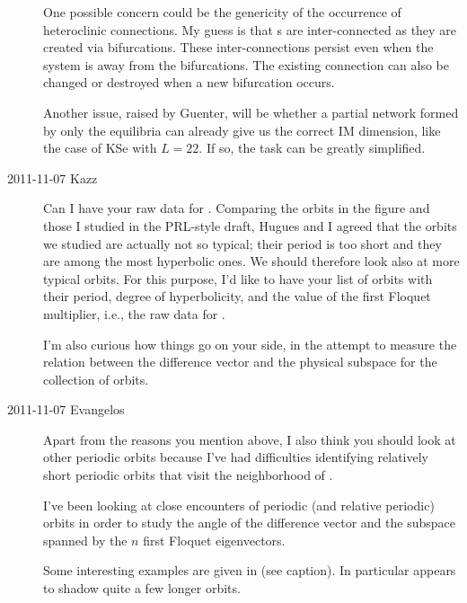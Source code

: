 \begin{description}
One possible concern could be the genericity of the occurrence of
heteroclinic connections. My guess is that \po s are inter-connected as
they are created via bifurcations. These inter-connections persist even
when the system is away from the bifurcations. The existing connection
can also be changed or destroyed when a new bifurcation occurs.

Another issue, raised by Guenter, will be whether a partial network
formed by only the equilibria can already give us the correct IM
dimension, like the case of KSe with $L=22$. If so, the task can be greatly
simplified.

\item[2011-11-07 Kazz] Can I have your raw data for .
Comparing the orbits in the figure and those I studied in the PRL-style draft,
Hugues and I agreed that the orbits we studied are actually not so typical;
their period is too short and they are among the most hyperbolic ones.
We should therefore look also at more typical orbits.
For this purpose, I'd like to have your list of orbits with their period,
degree of hyperbolicity, and the value of the first Floquet multiplier, i.e.,
the raw data for .

I'm also curious how things go on your side, in the attempt to measure
the relation between the difference vector and the physical subspace
for the collection of orbits.

\item[2011-11-07 Evangelos] Apart from the reasons you mention above,
I also think you should look at other periodic orbits because I've
had difficulties identifying relatively short periodic orbits that visit
the neighborhood of .

I've been looking at close encounters of periodic (and relative periodic) orbits
in order to study the angle of the difference vector and the subspace spanned
by the $n$ first Floquet eigenvectors.

Some interesting examples are given in  (see caption).
In particular  appears to shadow quite a few longer orbits.


\end{description}
